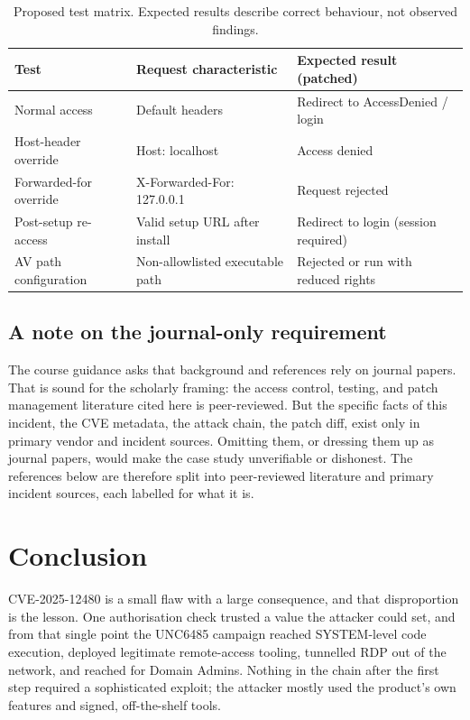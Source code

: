\documentclass[11pt,a4paper]{article}
\newcommand{\code}[1]{{\small\ttfamily #1}}
\begin{document}
\begin{table}[htbp]
\centering
\caption{Proposed test matrix. Expected results describe correct behaviour, not observed findings.}
\label{tab:matrix}
\small
\begin{tabularx}{\textwidth}{p{} X p{}}
\toprule
\rowcolor{headergrey}\textbf{Test} & \textbf{Request characteristic} & \textbf{Expected result (patched)} \\
\midrule
Normal access & Default headers & Redirect to \code{AccessDenied} / login \\
Host-header override & \code{Host: localhost} & Access denied \\
Forwarded-for override & \code{X-Forwarded-For: 127.0.0.1} & Request rejected \\
Post-setup re-access & Valid setup URL after install & Redirect to login (session required) \\
AV path configuration & Non-allowlisted executable path & Rejected or run with reduced rights \\
\bottomrule
\end{tabularx}
\end{table}

\subsection{A note on the journal-only requirement}

The course guidance asks that background and references rely on journal papers. That is sound for the scholarly framing: the access control, testing, and patch management literature cited here is peer-reviewed. But the specific facts of this incident, the CVE metadata, the attack chain, the patch diff, exist only in primary vendor and incident sources. Omitting them, or dressing them up as journal papers, would make the case study unverifiable or dishonest. The references below are therefore split into peer-reviewed literature and primary incident sources, each labelled for what it is.

\section{Conclusion}

CVE-2025-12480 is a small flaw with a large consequence, and that disproportion is the lesson. One authorisation check trusted a value the attacker could set, and from that single point the UNC6485 campaign reached \code{SYSTEM}-level code execution, deployed legitimate remote-access tooling, tunnelled RDP out of the network, and reached for Domain Admins. Nothing in the chain after the first step required a sophisticated exploit; the attacker mostly used the product's own features and signed, off-the-shelf tools.
\end{document}
